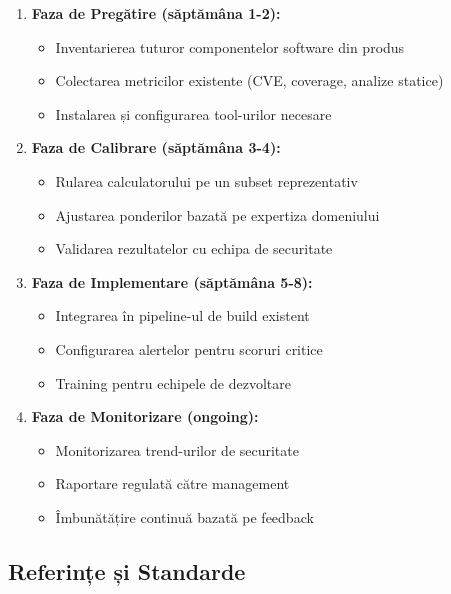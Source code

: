 \documentclass[12pt,a4paper]{article}
\begin{document}
\begin{enumerate}
\item \textbf{Faza de Pregătire (săptămâna 1-2):}
   \begin{itemize}
   \item Inventarierea tuturor componentelor software din produs
   \item Colectarea metricilor existente (CVE, coverage, analize statice)
   \item Instalarea și configurarea tool-urilor necesare
   \end{itemize}

\item \textbf{Faza de Calibrare (săptămâna 3-4):}
   \begin{itemize}
   \item Rularea calculatorului pe un subset reprezentativ
   \item Ajustarea ponderilor bazată pe expertiza domeniului
   \item Validarea rezultatelor cu echipa de securitate
   \end{itemize}

\item \textbf{Faza de Implementare (săptămâna 5-8):}
   \begin{itemize}
   \item Integrarea în pipeline-ul de build existent
   \item Configurarea alertelor pentru scoruri critice
   \item Training pentru echipele de dezvoltare
   \end{itemize}

\item \textbf{Faza de Monitorizare (ongoing):}
   \begin{itemize}
   \item Monitorizarea trend-urilor de securitate
   \item Raportare regulată către management
   \item Îmbunătățire continuă bazată pe feedback
   \end{itemize}
\end{enumerate}

\subsection{Referințe și Standarde}
\end{document}
